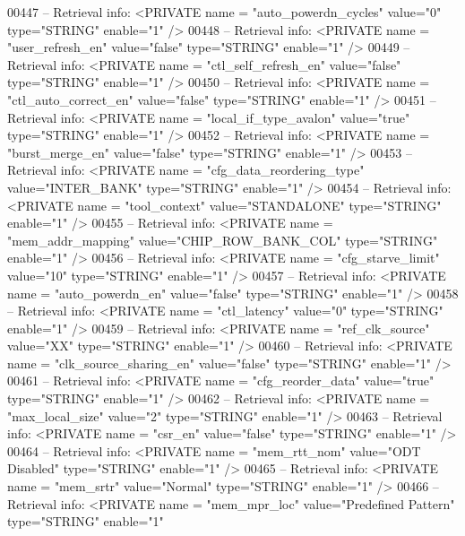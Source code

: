 \begin{DoxyCode}
{00447 \textcolor{keyword}{-- Retrieval info:      <PRIVATE name = "auto\_powerdn\_cycles" value="0"  type="STRING"  enable="1" />}
00448 \textcolor{keyword}{-- Retrieval info:      <PRIVATE name = "user\_refresh\_en" value="false"  type="STRING"  enable="1" />}
00449 \textcolor{keyword}{-- Retrieval info:      <PRIVATE name = "ctl\_self\_refresh\_en" value="false"  type="STRING"  enable="1" />}
00450 \textcolor{keyword}{-- Retrieval info:      <PRIVATE name = "ctl\_auto\_correct\_en" value="false"  type="STRING"  enable="1" />}
00451 \textcolor{keyword}{-- Retrieval info:      <PRIVATE name = "local\_if\_type\_avalon" value="true"  type="STRING"  enable="1" />}
00452 \textcolor{keyword}{-- Retrieval info:      <PRIVATE name = "burst\_merge\_en" value="false"  type="STRING"  enable="1" />}
00453 \textcolor{keyword}{-- Retrieval info:      <PRIVATE name = "cfg\_data\_reordering\_type" value="INTER\_BANK"  type="STRING" 
       enable="1" />}
00454 \textcolor{keyword}{-- Retrieval info:      <PRIVATE name = "tool\_context" value="STANDALONE"  type="STRING"  enable="1" />}
00455 \textcolor{keyword}{-- Retrieval info:      <PRIVATE name = "mem\_addr\_mapping" value="CHIP\_ROW\_BANK\_COL"  type="STRING" 
       enable="1" />}
00456 \textcolor{keyword}{-- Retrieval info:      <PRIVATE name = "cfg\_starve\_limit" value="10"  type="STRING"  enable="1" />}
00457 \textcolor{keyword}{-- Retrieval info:      <PRIVATE name = "auto\_powerdn\_en" value="false"  type="STRING"  enable="1" />}
00458 \textcolor{keyword}{-- Retrieval info:      <PRIVATE name = "ctl\_latency" value="0"  type="STRING"  enable="1" />}
00459 \textcolor{keyword}{-- Retrieval info:      <PRIVATE name = "ref\_clk\_source" value="XX"  type="STRING"  enable="1" />}
00460 \textcolor{keyword}{-- Retrieval info:      <PRIVATE name = "clk\_source\_sharing\_en" value="false"  type="STRING"  enable="1" />}
00461 \textcolor{keyword}{-- Retrieval info:      <PRIVATE name = "cfg\_reorder\_data" value="true"  type="STRING"  enable="1" />}
00462 \textcolor{keyword}{-- Retrieval info:      <PRIVATE name = "max\_local\_size" value="2"  type="STRING"  enable="1" />}
00463 \textcolor{keyword}{-- Retrieval info:      <PRIVATE name = "csr\_en" value="false"  type="STRING"  enable="1" />}
00464 \textcolor{keyword}{-- Retrieval info:      <PRIVATE name = "mem\_rtt\_nom" value="ODT Disabled"  type="STRING"  enable="1" />}
00465 \textcolor{keyword}{-- Retrieval info:      <PRIVATE name = "mem\_srtr" value="Normal"  type="STRING"  enable="1" />}
00466 \textcolor{keyword}{-- Retrieval info:      <PRIVATE name = "mem\_mpr\_loc" value="Predefined Pattern"  type="STRING"  enable="1"
}}
\end{DoxyCode}
